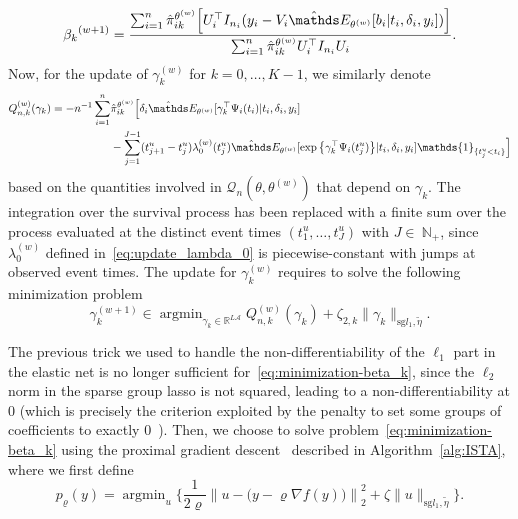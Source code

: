\documentclass[11pt]{article}
\DeclareMathOperator{\argmin}{argmin}
\newcommand{\ind}[1]{\mathds{1}_{#1}}
\newcommand{\norm}[1]{\|#1\|}
\newcommand{\sA}{\mathscr A}
\newcommand{\cQ}{\mathcal Q}
\newcommand{\R}{\mathds R}
\newcommand{\N}{\mathds N}
\newcommand{\E}{\mathds E}
\begin{document}
\begin{equation}
  \label{eq:update_beta}
  {\beta_k}^{(w+1)}= \dfrac{\sum_{i=1}^n\hat \pi_{ik}^{\theta^{(w)}} \Big[U_i^\top I_{n_i} (y_i - V_i\hat \E_{\theta^{(w)}}[ b_i | t_i, \delta_i, y_i])\Big]}{\sum_{i=1}^n \hat \pi_{ik}^{\theta^{(w)}} U_i^\top I_{n_i} U_i}.
\end{equation}
Now, for the update of $\gamma_k^{(w)}$ for $k=0, \ldots, K-1$, we similarly denote
\begin{align*}
  Q^{(w)}_{n,k}(\gamma_k) = -n^{-1} \sum_{i=1}^n &\hat\pi_{ik}^{\theta^{(w)}} \Big[\delta_i \hat \E_{\theta^{(w)}}[ \gamma_k^\top \Psi_i(t_i) | t_i, \delta_i, y_i] \\
  & - \sum_{j=1}^{J-1} (t_{j+1}^u-t_j^u) \lambda_0^{(w)}(t_j^u) \hat \E_{\theta^{(w)}}[\exp \big\{\gamma_k^\top \Psi_i(t_j^u)\big\} | t_i, \delta_i, y_i] \ind{\{t_j^u < t_i\}} \Big]
\end{align*}
based on the quantities involved in $\cQ_n(\theta, \theta^{(w)})$ that depend on $\gamma_k$. The integration over the survival process has been replaced with a finite sum over the process evaluated at the distinct event times $(t_1^u, \ldots, t_J^u)$ with $J \in~\N_+$, since $\lambda_0^{(w)}$ defined in~\eqref{eq:update_lambda_0} is piecewise-constant with jumps at observed event times. The update for $\gamma_k^{(w)}$ requires to solve the following minimization problem
\begin{equation}
  \label{eq:minimization-gamma_k}
  \gamma_k^{(w+1)} \in \argmin_{\gamma_k \in \R^{L\sA}} Q^{(w)}_{n,k}(\gamma_k) + \zeta_{2,k} \norm{\gamma_k}_{\text{sg} l_1, \tilde{\eta}}.
\end{equation}

The previous trick we used to handle the non-differentiability of the $\ell_1$ part in the elastic net is no longer sufficient for~\eqref{eq:minimization-beta_k}, since the $\ell_2$ norm in the sparse group lasso is not squared, leading to a non-differentiability at 0 (which is precisely the criterion exploited by the penalty to set some groups of coefficients to exactly 0~\citep{simon2013sparse}). Then, we choose to solve problem~\eqref{eq:minimization-beta_k} using the proximal gradient descent~\citep{boyd2004convex} described in Algorithm~\ref{alg:ISTA}, where we first define
\[p_{\varrho}(y) = \argmin_u \Big\{\dfrac{1}{2\varrho} \left\lVert u - \big(y - \varrho  \nabla f(y) \big)\right\rVert_2^2 + \zeta \norm{u}_{\text{sg} l_1, \tilde{\eta}} \Big\}.\]

\vspace{.5cm}
\end{document}
